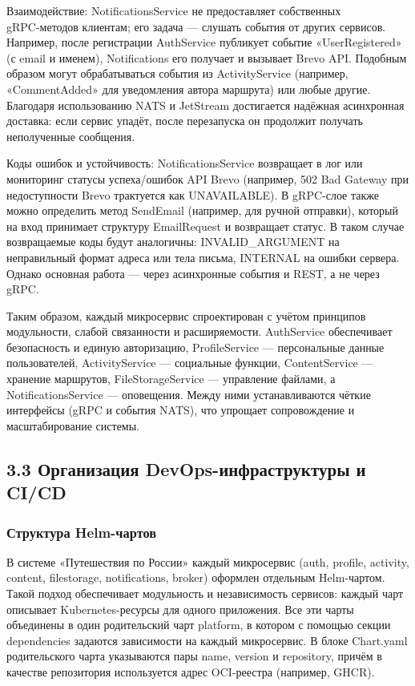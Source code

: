 Взаимодействие: NotificationsService не предоставляет собственных \\ gRPC-методов клиентам; его задача — слушать события от других сервисов. Например, после регистрации AuthService публикует событие «UserRegistered» (с email и именем), Notifications его получает и вызывает Brevo API. Подобным образом могут обрабатываться события из ActivityService (например, «CommentAdded» для уведомления автора маршрута) или любые другие. Благодаря использованию NATS и JetStream достигается надёжная асинхронная доставка: если сервис упадёт, после перезапуска он продолжит получать неполученные сообщения.

Коды ошибок и устойчивость: NotificationsService возвращает в лог или мониторинг статусы успеха/ошибок API Brevo (например, 502 Bad Gateway при недоступности Brevo трактуется как UNAVAILABLE). В gRPC-слое также можно определить метод SendEmail (например, для ручной отправки), который на вход принимает структуру EmailRequest и возвращает статус. В таком случае возвращаемые коды будут аналогичны: INVALID\_ARGUMENT на неправильный формат адреса или тела письма, INTERNAL на ошибки сервера. Однако основная работа — через асинхронные события и REST, а не через gRPC.

Таким образом, каждый микросервис спроектирован с учётом принципов модульности, слабой связанности и расширяемости. AuthService обеспечивает безопасность и единую авторизацию, ProfileService — персональные данные пользователей, ActivityService — социальные функции, ContentService — хранение маршрутов, FileStorageService — управление файлами, а \\ NotificationsService — оповещения. Между ними устанавливаются чёткие интерфейсы (gRPC и события NATS), что упрощает сопровождение и масштабирование системы. 

\subsection*{3.3 Организация DevOps-инфраструктуры и CI/CD}

\subsubsection*{Структура Helm-чартов}
В системе «Путешествия по России» каждый микросервис (auth, profile, activity, content, filestorage, notifications, broker) оформлен отдельным Helm-чартом. Такой подход обеспечивает модульность и независимость сервисов: каждый чарт описывает Kubernetes-ресурсы для одного приложения. Все эти чарты объединены в один родительский чарт platform, в котором с помощью секции dependencies задаются зависимости на каждый микросервис. В блоке Chart.yaml родительского чарта указываются пары name, version и repository, причём в качестве репозитория используется адрес OCI-реестра (например, GHCR). 

